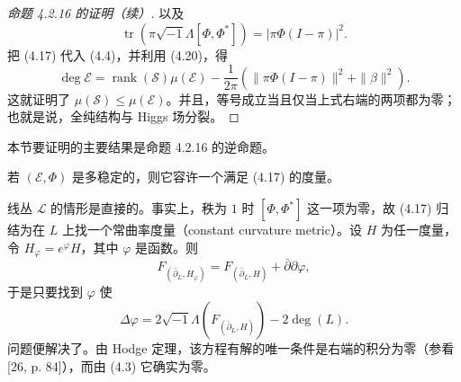 
\begin{proof}[命题 4.2.16 的证明（续）]
以及
\begin{equation}
\operatorname{tr}\left(\pi\sqrt{-1}\Lambda[\Phi,\Phi^*]\right)=|\pi\Phi(I-\pi)|^2.
\label{eq:4.20}
\tag{4.20}
\end{equation}
把 (4.17) 代入 (4.4)，并利用 (4.20)，得
\[
\deg\mathcal{E}=\operatorname{rank}(\mathcal{S})\mu(\mathcal{E})-\frac{1}{2\pi}\left(\|\pi\Phi(I-\pi)\|^2+\|\beta\|^2\right).
\]
这就证明了 $\mu(\mathcal{S})\le\mu(\mathcal{E})$。并且，等号成立当且仅当上式右端的两项都为零；也就是说，全纯结构与 Higgs 场分裂。
\end{proof}

本节要证明的主要结果是命题 4.2.16 的逆命题。

\begin{theorem}
若 $(\mathcal{E},\Phi)$ 是多稳定的，则它容许一个满足 (4.17) 的度量。
\end{theorem}

\begin{remark}
线丛 $\mathcal{L}$ 的情形是直接的。事实上，秩为 $1$ 时 $[\Phi,\Phi^*]$ 这一项为零，故 (4.17) 归结为在 $L$ 上找一个常曲率度量（constant curvature metric）。设 $H$ 为任一度量，令 $H_\varphi=e^\varphi H$，其中 $\varphi$ 是函数。则
\[
F_{(\bar\partial_L,H_\varphi)}=F_{(\bar\partial_L,H)}+\bar\partial\partial\varphi,
\]
于是只要找到 $\varphi$ 使
\[
\Delta\varphi=2\sqrt{-1}\Lambda(F_{(\bar\partial_L,H)})-2\deg(L).
\]
问题便解决了。由 Hodge 定理，该方程有解的唯一条件是右端的积分为零（参看 [26, p. 84]），而由 (4.3) 它确实为零。
\end{remark}

